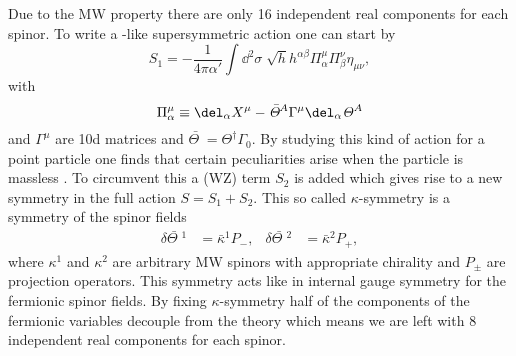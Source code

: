 %
%
Due to the MW property there are only 16 independent real components for each spinor. To write a -like supersymmetric action one can start by 
%
%
\begin{equation}
S_{1} = -\frac{1}{4\pi\alpha'} \int \dd^{2}\sigma \; \sqrt{h}h^{\alpha\beta} \Pi^{\mu}_{\alpha}\Pi^{\nu}_{\beta} \eta_{\mu\nu},
\end{equation}
%
%
with
%
%
\begin{equation}
\Pi^{\mu}_{\alpha} \equiv \del_{\alpha}X^{\mu} - \bar{\mathit{\Theta}\;}\!\!^{A}\Gamma^{\mu}\del_{\alpha}\mathit{\Theta}^{A}
\label{eq: Pi_susy}
\end{equation}
%
%
and $\Gamma^{\mu}$ are 10d  matrices and $\bar{\mathit{\Theta}\;}\!\!=\mathit{\Theta}^{\dagger}\Gamma_{0}$. By studying this kind of action for a point particle one finds that certain peculiarities arise when the particle is massless \cite{Becker:2007zj}. To circumvent this a  (WZ) term $S_{2}$ is added which gives rise to a new symmetry in the full action $S=S_{1}+S_{2}$.  This so called $\kappa$-symmetry is a symmetry of the spinor fields
%
%
\begin{align}
\delta\bar{\mathit{\Theta}\;}\!\!^{1} &= \bar{\kappa}^{1}P_{-}, & \delta\bar{\mathit{\Theta}\;}\!\!^{2} &= \bar{\kappa}^{2}P_{+},
\end{align}
%
%
where $\kappa^{1}$ and $\kappa^{2}$ are arbitrary MW spinors with appropriate chirality and $P_{\pm}$ are projection operators. This symmetry acts like in internal gauge symmetry for the fermionic spinor fields. By fixing $\kappa$-symmetry half of the components of the fermionic variables decouple from the theory which means we are left with 8 independent real components for each spinor.
%
%
%
%
%
%
%
%
